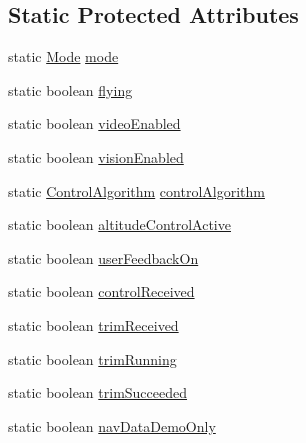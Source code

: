 \subsection*{Static Protected Attributes}
\begin{DoxyCompactItemize}
\item 
static \hyperlink{enumworkspace_1_1_a_r_drone_nav_data_1_1src_1_1controller_1_1_mode}{Mode} \hyperlink{classworkspace_1_1_a_r_drone_nav_data_1_1src_1_1_nav_data_a60cc1aab4d441d6d3467bfa777c85783}{mode}
\item 
static boolean \hyperlink{classworkspace_1_1_a_r_drone_nav_data_1_1src_1_1_nav_data_ac1dba2bfde73173b597de8aa3cb1c098}{flying}
\item 
static boolean \hyperlink{classworkspace_1_1_a_r_drone_nav_data_1_1src_1_1_nav_data_a03af8bd983f45a4b5dc9d3b7eb2f58f6}{video\+Enabled}
\item 
static boolean \hyperlink{classworkspace_1_1_a_r_drone_nav_data_1_1src_1_1_nav_data_a7c619c7616c1b70779634e4b091f4028}{vision\+Enabled}
\item 
static \hyperlink{enumworkspace_1_1_a_r_drone_nav_data_1_1src_1_1controller_1_1_control_algorithm}{Control\+Algorithm} \hyperlink{classworkspace_1_1_a_r_drone_nav_data_1_1src_1_1_nav_data_a8210edb20315ce66a16f616b8bf9f5db}{control\+Algorithm}
\item 
static boolean \hyperlink{classworkspace_1_1_a_r_drone_nav_data_1_1src_1_1_nav_data_ad6eb7c7c5facb95a474eb4ab91e51925}{altitude\+Control\+Active}
\item 
static boolean \hyperlink{classworkspace_1_1_a_r_drone_nav_data_1_1src_1_1_nav_data_addc7665d15f9b60196d060d0457b892d}{user\+Feedback\+On}
\item 
static boolean \hyperlink{classworkspace_1_1_a_r_drone_nav_data_1_1src_1_1_nav_data_afa4db24683e5caa8a469af2f49e78565}{control\+Received}
\item 
static boolean \hyperlink{classworkspace_1_1_a_r_drone_nav_data_1_1src_1_1_nav_data_ab490800281487c731918606060238281}{trim\+Received}
\item 
static boolean \hyperlink{classworkspace_1_1_a_r_drone_nav_data_1_1src_1_1_nav_data_a6c6665207779b66bc0c5dafcfad01cfa}{trim\+Running}
\item 
static boolean \hyperlink{classworkspace_1_1_a_r_drone_nav_data_1_1src_1_1_nav_data_a86153ea6a1c060502dc5f45ae1768afd}{trim\+Succeeded}
\item 
static boolean \hyperlink{classworkspace_1_1_a_r_drone_nav_data_1_1src_1_1_nav_data_adc7cbba2a29fed4fb01651c52280d74d}{nav\+Data\+Demo\+Only}

\end{DoxyCompactItemize}

